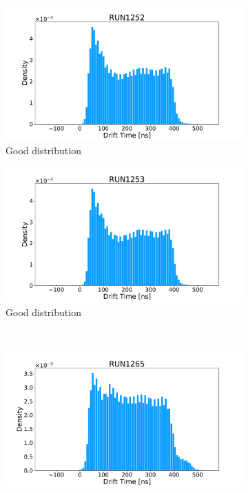 \begin{figure}[h]
    \begin{subfigure}[b]{0.5\textwidth}
        \centering 
        \includegraphics[width=1.0\textwidth]{./Images/experiment/RUN1252.pdf}
        \caption{Good distribution}
        \label{fig:dt_cat:a}
    \end{subfigure}%
    \hfill
    \begin{subfigure}[b]{0.5\textwidth}
        \centering 
        \includegraphics[width=1.0\textwidth]{./Images/experiment/RUN1253.pdf}
        \caption{Good distribution}
        \label{fig:dt_cat:b}
    \end{subfigure}%
    \\
    \begin{subfigure}[b]{0.5\textwidth}
        \centering 
        \includegraphics[width=1.0\textwidth]{./Images/experiment/RUN1265.pdf}

\end{subfigure}
\end{figure}
